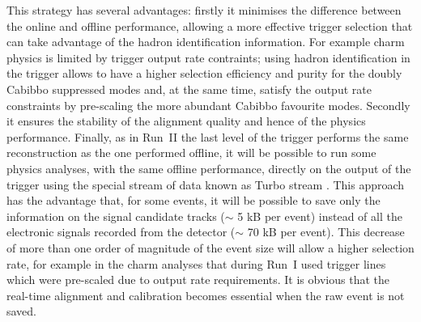 This strategy has several advantages: firstly it minimises the
difference between the online and offline performance, allowing a more
effective trigger selection that can take advantage of the hadron
identification information. For example charm physics is limited by
trigger output rate contraints; using hadron identification in the
trigger allows to have a higher selection efficiency and purity for
the doubly Cabibbo suppressed modes and, at the same time, satisfy the
output rate constraints by pre-scaling the more abundant Cabibbo
favourite modes.  Secondly it ensures the stability of the alignment
quality and hence of the physics performance.  Finally, as in Run~II
the last level of the trigger performs the same reconstruction as the
one performed offline,
it will be possible to run some physics analyses, with the same
offline performance, directly on the output of the trigger using the
special stream of data known as Turbo stream \cite{Sean}. This
approach has the advantage that, for some events, it will be possible
to save only the information on the signal candidate tracks ($\sim$ 5
kB per event) instead of all the electronic signals recorded from the
detector ($\sim$ 70 kB per event). This decrease of more than one
order of magnitude of the event size will allow a higher selection
rate, for example in the charm analyses that during Run~I used trigger
lines which were pre-scaled due to output rate requirements. It is
obvious that the real-time alignment and calibration becomes essential
when the raw event is not saved.

